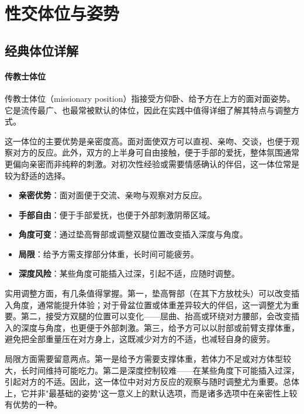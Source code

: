 \documentclass[12pt,UTF8]{ctexbook}
\newcommand{\keyword}[1]{\textbf{#1}}
\begin{document}
\part{性交体位与姿势}


\chapter{经典体位详解}

\subsection{传教士体位}

传教士体位（missionary position）指接受方仰卧、给予方在上方的面对面姿势。它是流传最广、也最常被默认的体位，因此在实践中值得详细了解其特点与调整方式。

这一体位的主要优势是亲密度高。面对面使双方可以直视、亲吻、交谈，也便于观察对方的反应。此外，双方的上半身可自由接触，便于手部的爱抚，整体氛围通常更偏向亲密而非纯粹的刺激。对初次性经验或需要情感确认的伴侣，这一体位常是较为舒适的选择。

\begin{itemize}
  \item \keyword{亲密优势}：面对面便于交流、亲吻与观察对方反应。
  \item \keyword{手部自由}：便于手部爱抚，也便于外部刺激阴蒂区域。
  \item \keyword{角度可变}：通过垫高臀部或调整双腿位置改变插入深度与角度。
  \item \keyword{局限}：给予方需支撑部分体重，长时间可能疲劳。
  \item \keyword{深度风险}：某些角度可能插入过深，引起不适，应随时调整。
\end{itemize}

实用调整方面，有几条值得掌握。第一，垫高臀部（在其下方放枕头）可以改变插入角度，通常能提升体验；对于骨盆位置或体重差异较大的伴侣，这一调整尤为重要。第二，接受方双腿的位置可以变化——屈曲、抬高或环绕对方腰部，会改变插入的深度与角度，也更便于外部刺激。第三，给予方可以以肘部或前臂支撑体重，避免把全部重量压在对方身上，这既减少对方的不适，也减轻自身的疲劳。

局限方面需要留意两点。第一是给予方需要支撑体重，若体力不足或对方体型较大，长时间维持可能吃力。第二是深度控制较难——在某些角度下可能插入过深，引起对方的不适。因此，这一体位中对对方反应的观察与随时调整尤为重要。总体上，它并非"最基础的姿势"这一意义上的默认选项，而是诸多选项中在亲密性上较有优势的一种。
\end{document}
